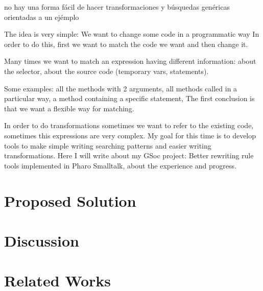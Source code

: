 \documentclass{article}
\begin{document}
no hay una forma fácil de hacer transformaciones y búsquedas genéricas orientadas a un ejémplo

The idea is very simple:
We want to change some code in a programmatic way
In order to do this, first we want to match the code we want and then change it.

Many times we want to match an expression having different information: about the selector, about the source code (temporary vars, statements).

Some examples:
all the methods with 2 arguments,
all methods called in a particular way,
a method containing a specific statement,
The first conclusion is that we want a flexible way for matching.


In order to do transformations sometimes we want to refer to the existing code, sometimes this expressions are very complex.
My goal for this time is to develop tools to make simple writing searching patterns and easier writing transformations.
Here I will write about my GSoc project: Better rewriting rule tools implemented in Pharo Smalltalk, about the experience and progress.


\section{Proposed Solution}
\label{sec:contribution}



\section{Discussion}
\label{sec:discussion}




\section{Related Works}
\label{sec:related}
\end{document}
